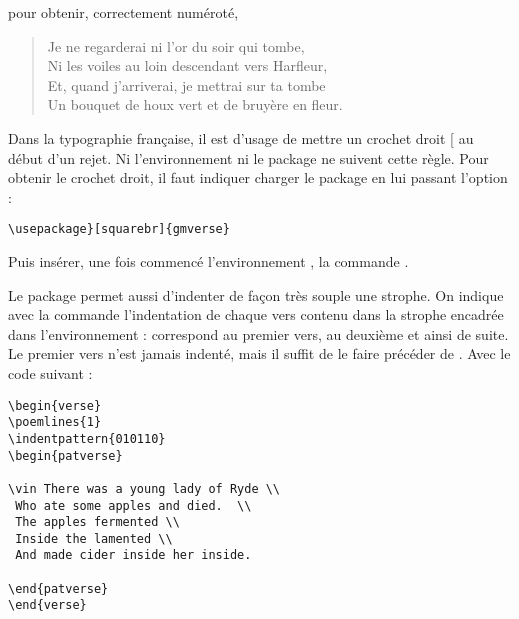 pour obtenir, correctement numéroté, 

\begin{verse}


Je ne regarderai ni l'or du soir qui tombe,\\
Ni les voiles au loin descendant vers Harfleur,\\
Et, quand j'arriverai, je mettrai sur ta tombe\\
Un bouquet de houx vert et de bruyère en fleur.

\end{verse}

\begin{anedocte}
Dans la typographie française, il est d'usage de mettre un crochet droit [ au début d'un rejet. Ni l'environnement ni le package  ne suivent cette règle. Pour obtenir le crochet droit, il faut indiquer charger le package   en lui passant l'option  :
\begin{verbatim}
\usepackage}[squarebr]{gmverse}
\end{verbatim}
Puis insérer, une fois commencé l'environnement , la commande .
\end{anedocte}

Le package  permet aussi d'indenter de façon très souple une strophe. On indique avec la commande  l'indentation de chaque vers contenu dans la strophe encadrée dans l'environnement :  correspond au premier vers,  au deuxième et ainsi de suite. Le premier vers n'est jamais indenté, mais il suffit de le faire précéder de . Avec le code suivant :

\begin{verbatim}
\begin{verse} 
\poemlines{1}
\indentpattern{010110} 
\begin{patverse} 

\vin There was a young lady of Ryde \\
 Who ate some apples and died.  \\
 The apples fermented \\
 Inside the lamented \\
 And made cider inside her inside. 

\end{patverse}  
\end{verse}
\end{verbatim}


